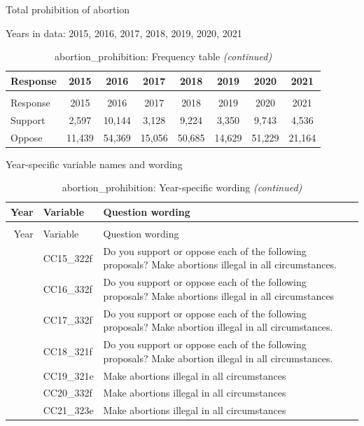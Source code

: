 \documentclass[
  12pt]{article}
\begin{document}
Total prohibition of abortion

Years in data: 2015, 2016, 2017, 2018, 2019, 2020,
2021\begingroup\fontsize{10}{12}\selectfont

\begin{longtable}[t]{lccccccc}
\caption{\label{tab:unnamed-chunk-5}abortion\_prohibition: Frequency table}\\
\toprule
Response & 2015 & 2016 & 2017 & 2018 & 2019 & 2020 & 2021\\
\midrule
\endfirsthead
\caption[]{abortion\_prohibition: Frequency table \textit{(continued)}}\\
\toprule
Response & 2015 & 2016 & 2017 & 2018 & 2019 & 2020 & 2021\\
\midrule
\endhead

\endfoot
\bottomrule
\endlastfoot
Support & 2,597 & 10,144 & 3,128 & 9,224 & 3,350 & 9,743 & 4,536\\
Oppose & 11,439 & 54,369 & 15,056 & 50,685 & 14,629 & 51,229 & 21,164\\*
\end{longtable}
\endgroup{}

Year-specific variable names and
wording\begingroup\fontsize{11}{13}\selectfont

\begin{longtable}[t]{rl>{\raggedright\arraybackslash}p{10cm}}
\caption{\label{tab:unnamed-chunk-5}abortion\_prohibition: Year-specific wording}\\
\toprule
Year & Variable & Question wording\\
\midrule
\endfirsthead
\caption[]{abortion\_prohibition: Year-specific wording \textit{(continued)}}\\
\toprule
Year & Variable & Question wording\\
\midrule
\endhead

\endfoot
\bottomrule
\endlastfoot
2015 & CC15\_322f & Do you support or oppose each of the following proposals? Make abortions illegal in all circumstances.\\
\addlinespace
2016 & CC16\_332f & Do you support or oppose each of the following proposals? Make abortions illegal in all circumstances\\
\addlinespace
2017 & CC17\_332f & Do you support or oppose each of the following proposals? Make abortion illegal in all circumstances.\\
\addlinespace
2018 & CC18\_321f & Do you support or oppose each of the following proposals? Make abortion illegal in all circumstances.\\
\addlinespace
2019 & CC19\_321e & Make abortions illegal in all circumstances\\
\addlinespace
2020 & CC20\_332f & Make abortions illegal in all circumstances\\
\addlinespace
2021 & CC21\_323e & Make abortions illegal in all circumstances\\*
\end{longtable}
\endgroup{}
\newpage
\end{document}
